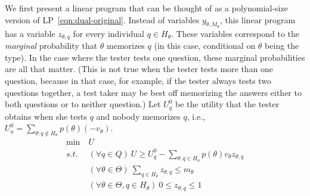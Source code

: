 \documentclass{article}
\begin{document}
We first present a  linear program that can be thought of as a
polynomial-size version of LP~\ref{eqn:dual-original}.  Instead of 
variables $y_{\theta,M_\theta}$, this linear program has a variable
$z_{\theta,q}$ for every individual $q \in H_\theta$.  These variables
correspond to the {\em marginal} probability that $\theta$ memorizes $q$
(in this case, conditional on $\theta$ being the type).
In the case where the tester tests one question, these marginal
probabilities are all that matter.  (This is not true when the tester tests
more than one question, because in that case, for example, if the tester
always tests two questions together, a test taker may be best off
memorizing the answers either to both questions or to neither question.)
 Let
$U^0_q$ be the utility that the tester obtains when she tests $q$ and nobody
memorizes $q$, i.e., $U^0_a =
\sum_{\theta: q \notin H_\theta} p(\theta)(-v_\theta)$. 
\begin{align}\label{eqn:one-problem}
	\min~ &U\\
	s.t.~ &(\forall q \in Q)~ U \geq U^0_q - \sum_{\theta : q \in
          H_\theta} p(\theta)v_\theta z_{\theta,q}\nonumber\\
	&(\forall \theta \in \Theta)~ \sum_{q \in H_\theta} z_{\theta,q} \leq m_\theta\nonumber\\
	&(\forall \theta \in \Theta, q \in H_\theta)~ 0 \leq z_{\theta, q} \leq 1\nonumber
\end{align}

\end{document}
